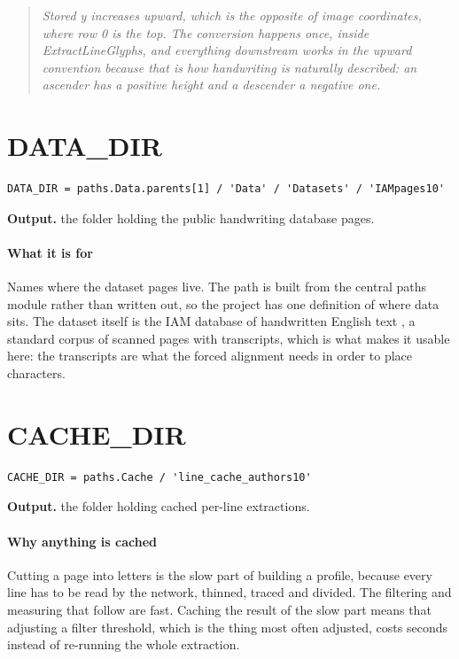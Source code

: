 \begin{quote}\small\itshape Stored y increases upward, which is the opposite of image coordinates, where row 0 is the top. The conversion happens once, inside ExtractLineGlyphs, and everything downstream works in the upward convention because that is how handwriting is naturally described: an ascender has a positive height and a descender a negative one.\end{quote}

\section{DATA\_DIR}
\begin{lstlisting}[style=sig]
DATA_DIR = paths.Data.parents[1] / 'Data' / 'Datasets' / 'IAMpages10'
\end{lstlisting}

\noindent\textbf{Output.} the folder holding the public handwriting database pages.


\paragraph{What it is for}
Names where the dataset pages live. The path is built from the central paths module rather than written out, so the project has one definition of where data sits. The dataset itself is the IAM database of handwritten English text \cite{marti2002}, a standard corpus of scanned pages with transcripts, which is what makes it usable here: the transcripts are what the forced alignment needs in order to place characters.


\section{CACHE\_DIR}
\begin{lstlisting}[style=sig]
CACHE_DIR = paths.Cache / 'line_cache_authors10'
\end{lstlisting}

\noindent\textbf{Output.} the folder holding cached per-line extractions.


\paragraph{Why anything is cached}
Cutting a page into letters is the slow part of building a profile, because every line has to be read by the network, thinned, traced and divided. The filtering and measuring that follow are fast. Caching the result of the slow part means that adjusting a filter threshold, which is the thing most often adjusted, costs seconds instead of re-running the whole extraction.

